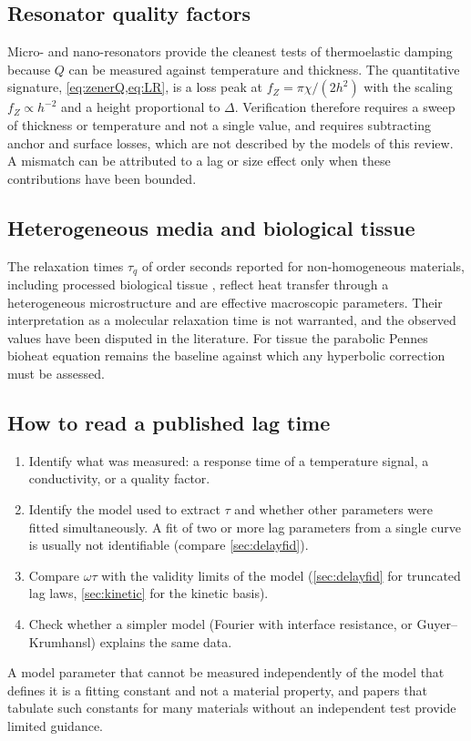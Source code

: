 \subsection{Resonator quality factors}
Micro- and nano-resonators provide the cleanest tests of thermoelastic damping because $Q$ can be measured against temperature and thickness. The quantitative signature, \cref{eq:zenerQ,eq:LR}, is a loss peak at $f_Z=\pi\chi/(2h^2)$ with the scaling $f_Z\propto h^{-2}$ and a height proportional to $\Delta$. Verification therefore requires a sweep of thickness or temperature and not a single value, and requires subtracting anchor and surface losses, which are not described by the models of this review. A mismatch can be attributed to a lag or size effect only when these contributions have been bounded.

\subsection{Heterogeneous media and biological tissue}
The relaxation times $\tau_q$ of order seconds reported for non-homogeneous materials, including processed biological tissue \citep{Mitra1995,Kaminski1990}, reflect heat transfer through a heterogeneous microstructure and are effective macroscopic parameters. Their interpretation as a molecular relaxation time is not warranted, and the observed values have been disputed in the literature. For tissue the parabolic Pennes bioheat equation \citep{Pennes1948} remains the baseline against which any hyperbolic correction must be assessed.

\subsection{How to read a published lag time}
\begin{enumerate}
\item Identify what was measured: a response time of a temperature signal, a conductivity, or a quality factor.
\item Identify the model used to extract $\tau$ and whether other parameters were fitted simultaneously. A fit of two or more lag parameters from a single curve is usually not identifiable (compare \cref{sec:delayfid}).
\item Compare $\omega\tau$ with the validity limits of the model (\cref{sec:delayfid} for truncated lag laws, \cref{sec:kinetic} for the kinetic basis).
\item Check whether a simpler model (Fourier with interface resistance, or Guyer--Krumhansl) explains the same data.
\end{enumerate}
A model parameter that cannot be measured independently of the model that defines it is a fitting constant and not a material property, and papers that tabulate such constants for many materials without an independent test provide limited guidance.

